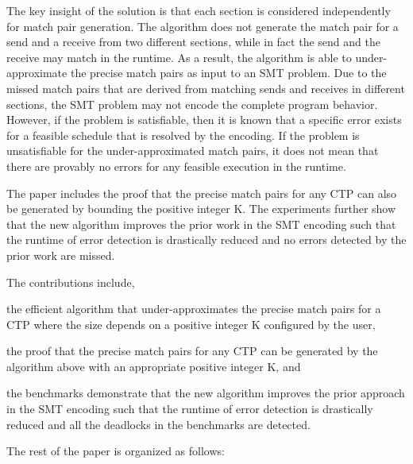 The key insight of the solution is that each section is considered independently for match pair generation.  
The algorithm does not generate the match pair for a send and a receive from two different sections, while in fact the send and the receive may match in the runtime. 
As a result, the algorithm is able to under-approximate the precise match pairs as input to an SMT problem. 
Due to the missed match pairs that are derived from matching sends and receives in different sections, the SMT problem may not encode the complete program behavior. However, if the problem is satisfiable, then it is known that a specific error exists for a feasible schedule that is resolved by the encoding. If the problem is unsatisfiable for the under-approximated match pairs, it does not mean that there are provably no errors for any feasible execution in the runtime.

The paper includes the proof that the precise match pairs for any CTP can also be generated by bounding the positive integer K. The experiments further show that the new algorithm improves the prior work in the SMT encoding such that the runtime of error detection is drastically reduced and no errors detected by the prior work are missed.


The contributions include,
\begin{compactitem}
\item the efficient algorithm that under-approximates the precise match pairs for a CTP where the size depends on a positive integer K configured by the user,
\item the proof that the precise match pairs for any CTP can be generated by the algorithm above with an appropriate positive integer K, and
\item the benchmarks demonstrate that the new algorithm improves the prior approach in the SMT encoding such that the runtime of error detection is drastically reduced and all the deadlocks in the benchmarks are detected. 
\end{compactitem}

The rest of the paper is organized as follows:
